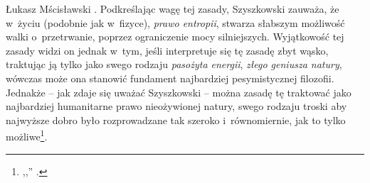 \begin{artplenv}{Łukasz Mścisławski}
\parencite[por.][s.~32–33]{szyszkowski_1909}. %
 Podkreślając wagę tej zasady, Szyszkowski zauważa, że w~życiu (podobnie jak w~fizyce), \textit{prawo entropii}, stwarza słabszym możliwość walki o~przetrwanie, poprzez ograniczenie mocy silniejszych. Wyjątkowość tej zasady widzi on jednak w~tym, jeśli interpretuje się tę zasadę zbyt wąsko, traktując ją tylko jako swego rodzaju \textit{pasożyta energii}, \textit{złego geniusza natury}, wówczas może ona stanowić fundament najbardziej pesymistycznej filozofii. Jednakże -- jak zdaje się uważać Szyszkowski -- można zasadę tę traktować jako najbardziej humanitarne prawo nieożywionej natury, swego rodzaju troski aby najwyższe dobro było rozprowadzane tak szeroko i~równomiernie, jak to tylko możliwe\footnote{,,'' 
\parencite[][s.~33]{szyszkowski_1909}.}.


\end{artplenv}
